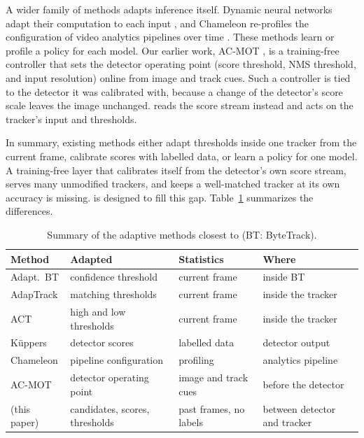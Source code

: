 A wider family of methods adapts inference itself. Dynamic neural networks
adapt their computation to each input \cite{han2022dynamic}, and Chameleon
re-profiles the configuration of video analytics pipelines over time
\cite{jiang2018chameleon}. These methods learn or profile a policy for each
model. Our earlier work, AC-MOT \cite{ismail2026acmot}, is a training-free
controller that sets the detector operating point (score threshold, NMS
threshold, and input resolution) online from image and track cues. Such a
controller is tied to the detector it was calibrated with, because a change
of the detector's score scale leaves the image unchanged. \scl{} reads the
score stream instead and acts on the tracker's input and thresholds.

In summary, existing methods either adapt thresholds inside one tracker from
the current frame, calibrate scores with labelled data, or learn a policy for
one model. A training-free layer that calibrates itself from the detector's
own score stream, serves many unmodified trackers, and keeps a well-matched
tracker at its own accuracy is missing. \scl{} is designed to fill this gap.
Table~\ref{tab:related} summarizes the differences.

\begin{table}[t]
\caption{Summary of the adaptive methods closest to \scl{} (BT: ByteTrack).}
\label{tab:related}
\centering\footnotesize
\setlength{\tabcolsep}{3pt}
\begin{tabular}{@{}>{\raggedright\arraybackslash}p{17mm}>{\raggedright\arraybackslash}p{18mm}>{\raggedright\arraybackslash}p{15mm}>{\raggedright\arraybackslash}p{18mm}@{}}
\toprule
Method & Adapted & Statistics & Where\\
\midrule
Adapt.\ BT \cite{ma2023adaptivebytetrack} & confidence threshold & current frame & inside BT\\
AdapTrack \cite{shim2024adaptrack} & matching thresholds & current frame & inside the tracker\\
ACT \cite{act2026adaptive} & high and low thresholds & current frame & inside the tracker\\
K{\"u}ppers \cite{kuppers2020detcalib} & detector scores & labelled data & detector output\\
Chameleon \cite{jiang2018chameleon} & pipeline configuration & profiling & analytics pipeline\\
AC-MOT \cite{ismail2026acmot} & detector operating point & image and track cues & before the detector\\
\scl{} (this paper) & candidates, scores, thresholds & past frames, no labels & between detector and tracker\\
\bottomrule
\end{tabular}
\end{table}
